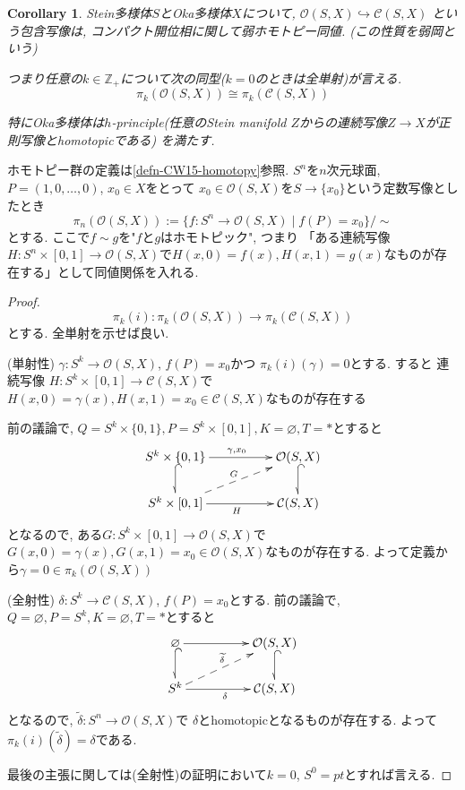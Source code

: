 \documentclass[dvipdfmx,a4paper,11pt]{article} %
\newtheorem{cor}[thm]{Corollary}
\theoremstyle{definition}
\theoremstyle{remark}
\numberwithin{equation}{section}
\newcommand{\N}{\mathbb{Z}_+}
\begin{document}
\begin{cor}
\label{cor-Oka-hP}
Stein多様体\(S\)とOka多様体\(X\)について, 
\(
\mathcal{O}(S,X) \hookrightarrow \mathcal{C}(S,X)
\)
という包含写像は, コンパクト開位相に関して弱ホモトピー同値. (この性質を弱岡という)

つまり任意の$k \in \N$について次の同型($k=0$のときは全単射)が言える. 
$$\pi_{k}(\mathcal{O}(S,X)) \cong \pi_{k}(\mathcal{C}(S,X))$$

特にOka多様体は$h$-principle(任意のStein manifold $Z$からの連続写像$Z \to X$が正則写像とhomotopicである) を満たす.
\end{cor}

ホモトピー群の定義は\ref{defn-CW15-homotopy}参照.
$S^n$を$n$次元球面, $P=(1, 0, \ldots, 0)$, $x_0 \in X$をとって
$x_0\in \mathcal{O}(S,X)$を$S \to \{ x_0\}$という定数写像としたとき
$$
\pi_{n}(\mathcal{O}(S,X) ):= \{ f : S^{n}\to \mathcal{O}(S,X) \mid f(P)=x_0\}/\sim
$$
とする.
 ここで$f \sim g$を"$f$と$g$はホモトピック", つまり
「ある連続写像$H : S^{n}\times [0,1] \to \mathcal{O}(S,X)$で$H(x, 0)=f(x), H(x, 1)=g(x)$なものが存在する」として同値関係を入れる. 

\begin{proof}
\[
\pi_k(i) : \pi_{k}(\mathcal{O}(S,X) ) \rightarrow \pi_{k}(\mathcal{C}(S,X))
\]
とする. 全単射を示せば良い.

(単射性) 
$\gamma : S^{k}\to \mathcal{O}(S,X)$, $f(P)=x_0$かつ
$\pi_k(i)(\gamma)=0$とする. 
すると 
連続写像
$H : S^{k}\times [0,1] \to \mathcal{C}(S,X)$で$H(x, 0)=\gamma (x), H(x, 1)=x_0 \in \mathcal{C}(S,X)$なものが存在する

前の議論で, $Q=S^{k} \times \{ 0, 1\}, P=S^{k}\times [0,1] , K=\varnothing, T=\ast $とすると
 \[
\xymatrix@C=50pt@R=20pt{
S^{k} \times \{ 0, 1\}\ar@{->}[r]^{ \gamma, x_0}\ar@{^{(}-_>}[d] &\mathcal{O}(S,X) \ar@{^{(}-_>}[d]  \\
S^{k}\times [0,1] \ar@{->}[r]_{H}\ar@{-->}[ru]^{G}  & \mathcal{C}(S,X)
}
\]
となるので, ある$G : S^{k}\times [0,1] \to \mathcal{O}(S,X)$で$G(x, 0)=\gamma (x), G(x, 1)=x_0 \in \mathcal{O}(S,X)$なものが存在する. よって定義から$\gamma=0 \in \pi_{k}(\mathcal{O}(S,X) )$

(全射性)
$\delta : S^{k}\to \mathcal{C}(S,X)$, $f(P)=x_0$とする. 
前の議論で, $Q=\varnothing,  P=S^{k} , K=\varnothing, T=\ast $とすると \[
\xymatrix@C=50pt@R=20pt{
\varnothing\ar@{->}[r]\ar@{^{(}-_>}[d] &\mathcal{O}(S,X) \ar@{^{(}-_>}[d]  \\
S^{k}\ar@{->}[r]_{\delta }\ar@{-->}[ru]^{\widetilde{\delta}}  & \mathcal{C}(S,X)
}
\]
となるので, $\widetilde{\delta} : S^{n}\to \mathcal{O}(S,X)$で
$\delta$とhomotopicとなるものが存在する. 
よって$\pi_k(i)(\widetilde{\delta})=\delta$である.  

最後の主張に関しては(全射性)の証明において$k=0$, $S^0 =pt$とすれば言える.  
\end{proof}
\end{document}
